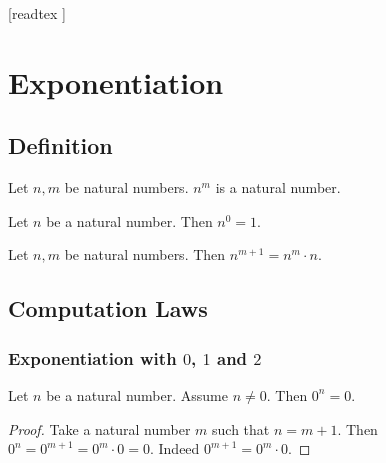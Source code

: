 \documentclass[10pt]{article}
\begin{document}
  \begin{imports}
    \begin{forthel}
      [readtex ]
    \end{forthel}
  \end{imports}


  \section*{Exponentiation}

  \subsection*{Definition}

  \begin{forthel}
    \begin{signature}
      Let $n, m$ be natural numbers.
      $n^{m}$ is a natural number.
    \end{signature}
  \end{forthel}

  \begin{forthel}
    \begin{axiom}
      Let $n$ be a natural number.
      Then $n^{0} = 1$.
    \end{axiom}
  \end{forthel}

  \begin{forthel}
    \begin{axiom}
      Let $n, m$ be natural numbers.
      Then $n^{m + 1} = n^{m} \cdot n$.
    \end{axiom}
  \end{forthel}


  \subsection*{Computation Laws}

  \subsubsection*{Exponentiation with $0$, $1$ and $2$}

  \begin{forthel}
    \begin{proposition}
      Let $n$ be a natural number.
      Assume $n \neq 0$.
      Then $0^{n} = 0$.
    \end{proposition}
    \begin{proof}
      Take a natural number $m$ such that $n = m + 1$.
      Then $0^{n}
        = 0^{m + 1}
        = 0^{m} \cdot 0
        = 0$.
      Indeed $0^{m + 1} = 0^{m} \cdot 0$.
    \end{proof}
  \end{forthel}
\end{document}
